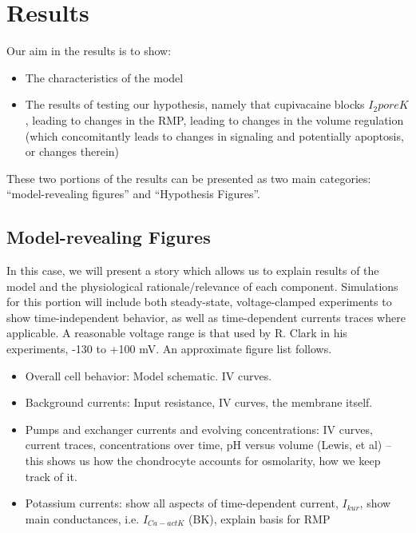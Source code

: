 \section{Results}
\label{results}

Our aim in the results is to show:
\begin{itemize}
\item The characteristics of the model
\item The results of testing our hypothesis, namely that cupivacaine
  blocks $I_2poreK$, leading to changes in the RMP, leading to changes
  in the volume regulation (which concomitantly leads to changes in
  signaling and potentially apoptosis, or changes therein)
\end{itemize}

These two portions of the results can be presented as two main
categories: ``model-revealing figures'' and ``Hypothesis Figures''.

\subsection{Model-revealing Figures}
In this case, we will present a story which allows us to explain
results of the model and the physiological rationale/relevance of each
component. Simulations for this portion will include both
steady-state, voltage-clamped experiments to show time-independent
behavior, as well as time-dependent currents traces where
applicable. A reasonable voltage range is that used by R. Clark in his
experiments, -130 to +100 mV. An approximate figure list follows.

\begin{itemize}
\item Overall cell behavior: Model schematic. IV curves.
\item Background currents: Input resistance, IV curves, the membrane itself.
\item Pumps and exchanger currents and evolving concentrations: IV
  curves, current traces, concentrations over time, pH versus volume
  (Lewis, et al) -- this shows us how the chondrocyte accounts for
  osmolarity, how we keep track of it.
\item Potassium currents: show all aspects of time-dependent current,
  $I_{kur}$, show main conductances, i.e. $I_{Ca-act K}$ (BK), explain
  basis for RMP
\end{itemize}

